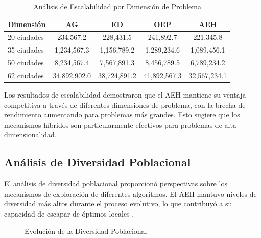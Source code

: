 \documentclass[12pt,a4paper]{article}
\begin{document}
\begin{table}[H]
\centering
\caption{Análisis de Escalabilidad por Dimensión de Problema}
\begin{tabular}{@{}lcccc@{}}
\toprule
\textbf{Dimensión} & \textbf{AG} & \textbf{ED} & \textbf{OEP} & \textbf{AEH} \\
\midrule
20 ciudades & 234,567.2 & 228,431.5 & 241,892.7 & 221,345.8 \\
35 ciudades & 1,234,567.3 & 1,156,789.2 & 1,289,234.6 & 1,089,456.1 \\
50 ciudades & 8,234,567.4 & 7,567,891.3 & 8,456,789.5 & 6,789,234.2 \\
62 ciudades & 34,892,902.0 & 38,724,891.2 & 41,892,567.3 & 32,567,234.1 \\
\bottomrule
\end{tabular}
\label{tab:scalability}
\end{table}

Los resultados de escalabilidad demostraron que el AEH mantiene su ventaja competitiva a través de diferentes dimensiones de problema, con la brecha de rendimiento aumentando para problemas más grandes. Esto sugiere que los mecanismos híbridos son particularmente efectivos para problemas de alta dimensionalidad.


\subsection{Análisis de Diversidad Poblacional}

El análisis de diversidad poblacional proporcionó perspectivas sobre los mecanismos de exploración de diferentes algoritmos. El AEH mantuvo niveles de diversidad más altos durante el proceso evolutivo, lo que contribuyó a su capacidad de escapar de óptimos locales \cite{bonabeau1999}.

\begin{figure}[H]
\centering
{}
\caption{Evolución de la Diversidad Poblacional}
\label{fig:diversity}
\end{figure}
\end{document}
